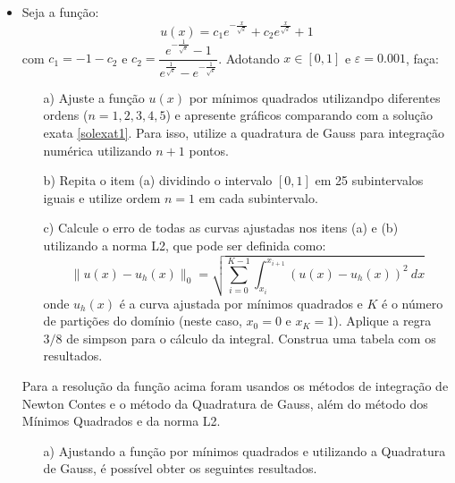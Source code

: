 \documentclass{article}
\newcounter{execs}
\newcommand{\exec}[0]{\addtocounter{execs}{1}\item[\textbf{\arabic{execs}.}]}
\begin{document}
\thispagestyle{first}
%    

\begin{itemize}

\exec Seja a função:
\begin{equation}\label{solexat1}
u(x) = c_1 e^{-\tfrac{x}{\sqrt{\varepsilon}}} + c_2 e^{\tfrac{x}{\sqrt{\varepsilon}}}+1
\end{equation}
com $c_1 = -1-c_2$ e $c_2 = \dfrac{e^{-\tfrac{1}{\sqrt{\varepsilon}}}-1}
{e^{\tfrac{1}{\sqrt{\varepsilon}}}-e^{-\tfrac{1}{\sqrt{\varepsilon}}}}$.
Adotando $x\in [0,1]$ e $\varepsilon=0.001$, faça:

\begin{itemize}

\item[a)] Ajuste a função $u(x)$ por mínimos quadrados utilizandpo diferentes ordens ($n=1,2,3,4,5$) e apresente gráficos comparando com a solução exata \eqref{solexat1}. Para isso, utilize a quadratura de Gauss para integração numérica utilizando $n+1$ pontos. 

\item [b)] Repita o item (a) dividindo o intervalo $[0,1]$ em 25 subintervalos iguais e utilize ordem $n=1$ em cada subintervalo. 

\item [c)] Calcule o erro de todas as curvas ajustadas nos itens (a) e (b) utilizando a norma L2, que pode ser definida como:
$$
\|u(x)-u_h(x)\|_0 =\sqrt{ \sum_{i=0}^{K-1} \int_{x_i}^{x_{i+1}} (u(x)-u_h(x))^2~dx}
$$
onde $u_h(x)$ é a curva ajustada por mínimos quadrados e $K$ é o número de partições do domínio (neste caso, $x_0=0$ e $x_K=1$). Aplique a regra $3/8$ de simpson para o cálculo da integral. Construa uma tabela com os resultados.

\end{itemize}


\newpage
\text Para a resolução da função acima foram usandos os métodos de integração de Newton Contes e o método da Quadratura de Gauss, além do método dos Mínimos Quadrados e da norma L2.

\begin{itemize}

\item[a)] Ajustando a função por mínimos quadrados e utilizando a Quadratura de Gauss, é possível obter os seguintes resultados.


\end{itemize}
\end{itemize}
\end{document}
